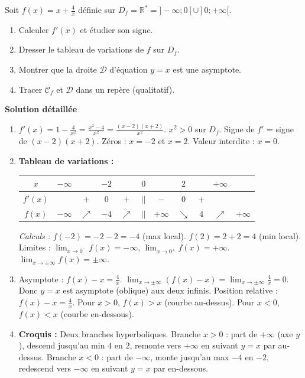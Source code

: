 \documentclass[11pt]{article}
\begin{document}
\begin{exoresolu}
Soit $f(x) = x + \frac{4}{x}$ définie sur $D_f = \mathbb{R}^* = ]-\infty;0[ \cup ]0;+\infty[$.
\begin{enumerate}
    \item Calculer $f'(x)$ et étudier son signe.
    \item Dresser le tableau de variations de $f$ sur $D_f$.
    \item Montrer que la droite $\mathcal{D}$ d'équation $y=x$ est une asymptote.
    \item Tracer $\mathcal{C}_f$ et $\mathcal{D}$ dans un repère (qualitatif).
\end{enumerate}
\tcblower
\textbf{Solution détaillée}
\begin{enumerate}
    \item $f'(x) = 1 - \frac{4}{x^2} = \frac{x^2-4}{x^2} = \frac{(x-2)(x+2)}{x^2}$.
    $x^2 > 0$ sur $D_f$. Signe de $f'$ = signe de $(x-2)(x+2)$.
    Zéros : $x=-2$ et $x=2$. Valeur interdite : $x=0$.
    
    \item \textbf{Tableau de variations :}
    \begin{center}
    \begin{tabular}{|c|cccccccccc|}\hline
    $x$ & $-\infty$ & & $-2$ & & $0$ & & $2$ & & $+\infty$ \\ \hline
    $f'(x)$ & & $+$ & $0$ & $+$ & $||$ & $-$ & $0$ & $+$ & \\ \hline
    $f(x)$ & $-\infty$ & $\nearrow$ & $-4$ & $\nearrow$ & $||$ & $+\infty$ & $\searrow$ & $4$ & $\nearrow$ & $+\infty$ \\ \hline
    \end{tabular}
    \end{center}
    \textit{Calculs :} $f(-2)=-2-2=-4$ (max local). $f(2)=2+2=4$ (min local).
    Limites : $\lim_{x\to 0^-} f(x) = -\infty$, $\lim_{x\to 0^+} f(x) = +\infty$. $\lim_{x\to\pm\infty} f(x) = \pm\infty$.
    
    \item Asymptote : $f(x) - x = \frac{4}{x}$. $\lim_{x\to\pm\infty} (f(x)-x) = \lim_{x\to\pm\infty} \frac{4}{x} = 0$.
    Donc $y=x$ est asymptote (oblique) aux deux infinis. Position relative : $f(x)-x = \frac{4}{x}$. Pour $x>0$, $f(x)>x$ (courbe au-dessus). Pour $x<0$, $f(x)<x$ (courbe en-dessous).
    
    \item \textbf{Croquis :} Deux branches hyperboliques. Branche $x>0$ : part de $+\infty$ (axe $y$), descend jusqu'au min $4$ en $2$, remonte vers $+\infty$ en suivant $y=x$ par au-dessus. Branche $x<0$ : part de $-\infty$, monte jusqu'au max $-4$ en $-2$, redescend vers $-\infty$ en suivant $y=x$ par en-dessous.
\end{enumerate}
\end{exoresolu}
\end{document}
